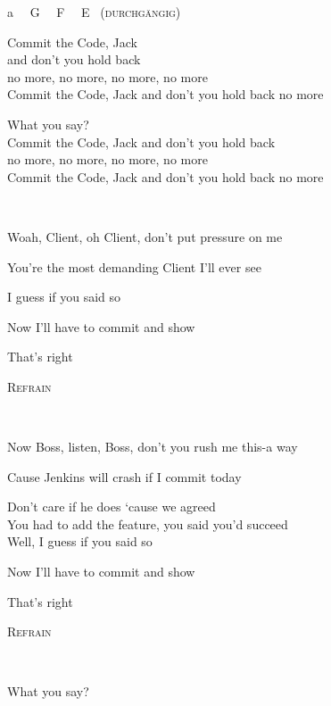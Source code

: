 \documentclass[11pt,a5paper]{article}
\newcommand\refrain[1]{\begin{tcolorbox}#1\end{tcolorbox} \ }
\newcommand{\refrefrain}{\refrain{\textsc{Refrain}} \ }
\begin{document}
	a \ \ G \ \ F \ \ E \ \textsc{(durchgängig)}
	
	\refrain{
	Commit the Code, Jack \\
	and don’t you hold back \\
    no more, no more, no more, no more \\
	Commit the Code, Jack and don’t you hold back no more
    
	\hfill What you say? \\
	Commit the Code, Jack and don’t you hold back \\
    no more, no more, no more, no more \\
	Commit the Code, Jack and don’t you hold back no more}
    
	\hfill Woah, Client, oh Client, don’t put pressure on me
    
	\hfill You’re the most demanding Client I’ll ever see
    
	\hfill I guess if you said so
    
	\hfill Now I’ll have to commit and show 
    
	That’s right \\
	
	\refrefrain
	
	\hfill Now Boss, listen, Boss, don’t you rush me this-a way
	
	\hfill Cause Jenkins will crash if I commit today
	
	Don’t care if he does ‘cause we agreed \\
	You had to add the feature, you said you’d succeed \\
	
	\hfill Well, I guess if you said so
	
	\hfill Now I’ll have to commit and show 
	
	That’s right \\
	
	\refrefrain
	
	\hfill What you say?
\end{document}

